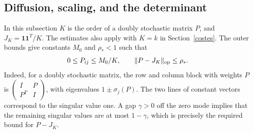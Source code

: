 \subsection{Diffusion, scaling, and the determinant}\label{permanente}

In this subsection $K$ is the order of a doubly stochastic matrix $P$, and
$J_K=\mathbf1\mathbf1^T/K$. The estimates also apply with $K=k$ in Section~\ref{costes}.
The outer bounds give constants $M_0$ and $\rho_*<1$ such that
\begin{equation}\label{terminal-hipotesis-matriz}
 0\le P_{ij}\le M_0/K,\qquad \|P-J_K\|_{\rm op}\le\rho_* .
\end{equation}
Indeed, for a doubly stochastic matrix, the row and column block with weights $P$ is
$\left(\begin{smallmatrix}I&P\\P^T&I\end{smallmatrix}\right)$, with eigenvalues $1\pm\sigma_j(P)$.
The two lines of constant vectors correspond to the singular value one. A gap $\gamma>0$ off
the zero mode implies that the remaining singular values are at most $1-\gamma$, which is
precisely the required bound for $P-J_K$.

